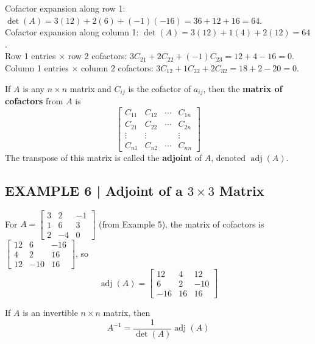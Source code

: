 \documentclass{article}
\theoremstyle{mystyle}
\begin{document}
Cofactor expansion along row 1: $\det(A)=3(12)+2(6)+(-1)(-16)=36+12+16=64$.\\
Cofactor expansion along column 1: $\det(A)=3(12)+1(4)+2(12)=64$. \checkmark\\
Row 1 entries $\times$ row 2 cofactors: $3C_{21}+2C_{22}+(-1)C_{23}=12+4-16=0$.\\
Column 1 entries $\times$ column 2 cofactors: $3C_{12}+1C_{22}+2C_{32}=18+2-20=0$.

\begin{tcolorbox}[colback=teal!4, colframe=teal!65!black,
  title={\textbf{Definition 1}}, boxrule=0.5mm, arc=3mm]
If $A$ is any $n\times n$ matrix and $C_{ij}$ is the cofactor of $a_{ij}$, then the
\textbf{matrix of cofactors} from $A$ is
\[
\begin{bmatrix}C_{11}&C_{12}&\cdots&C_{1n}\\C_{21}&C_{22}&\cdots&C_{2n}\\
\vdots&\vdots&&\vdots\\C_{n1}&C_{n2}&\cdots&C_{nn}\end{bmatrix}
\]
The transpose of this matrix is called the \textbf{adjoint} of $A$, denoted $\operatorname{adj}(A)$.
\end{tcolorbox}

\subsection*{EXAMPLE 6 | Adjoint of a $3\times 3$ Matrix}

For $A=\begin{bmatrix}3&2&-1\\1&6&3\\2&-4&0\end{bmatrix}$ (from Example 5), the matrix of
cofactors is $\begin{bmatrix}12&6&-16\\4&2&16\\12&-10&16\end{bmatrix}$, so
\[
\operatorname{adj}(A)=\begin{bmatrix}12&4&12\\6&2&-10\\-16&16&16\end{bmatrix}
\]

\begin{tcolorbox}[colback=red!4, colframe=red!60!black,
  title={\textbf{Theorem 2.3.6 --- Inverse of a Matrix Using Its Adjoint}}, boxrule=0.5mm, arc=3mm]
If $A$ is an invertible $n\times n$ matrix, then
\begin{equation}
A^{-1}=\frac{1}{\det(A)}\operatorname{adj}(A) \tag{6}
\end{equation}
\end{tcolorbox}
\end{document}
